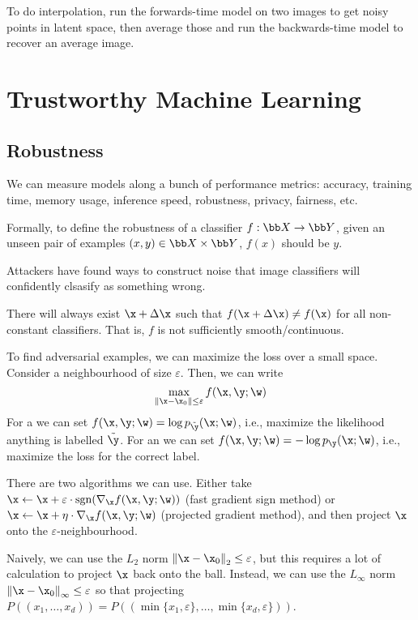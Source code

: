 \documentclass[class=cs480,notes,tikz]{agony}
\begin{document}
To do interpolation, run the forwards-time model on two images to get
noisy points in latent space, then average those and run the backwards-time model
to recover an average image.

\chapter{Trustworthy Machine Learning}
\section{Robustness}

We can measure models along a bunch of performance metrics:
accuracy, training time, memory usage, inference speed,
robustness, privacy, fairness, etc.

Formally, to define the robustness of a classifier $f : \bb X \to \bb Y$,
given an unseen pair of examples $(x,y) \in \bb X \times \bb Y$, $f(x)$ should be $y$.

Attackers have found ways to construct noise that image classifiers
will confidently clsasify as something wrong.

There will always exist  $\x + \Delta\x$
such that $f(\x + \Delta\x) \neq f(\x)$ for all non-constant classifiers.
That is, $f$ is not sufficiently smooth/continuous.

To find adversarial examples, we can maximize the loss over a small space.
Consider a neighbourhood of size $\varepsilon$. Then, we can write
\[ \max_{\norm{\x-\x_0} \leq \varepsilon} f(\x,\y;\w) \]
For a  we can set $f(\x,\y;\w) = \log p_{\tilde{\y}}(\x;\w)$,
i.e., maximize the likelihood anything is labelled $\tilde{\y}$.
For an  we can set $f(\x,\y;\w) = -\log p_{\y}(\x;\w)$,
i.e., maximize the loss for the correct label.

There are two algorithms we can use.
Either take $\x \gets \x + \varepsilon\cdot\sgn(\nabla_{\x}f(\x,\y;\w))$
(fast gradient sign method)
or $\x \gets \x + \eta\cdot\nabla_{\x}f(\x,\y;\w)$
(projected gradient method),
and then project $\x$ onto the $\varepsilon$-neighbourhood.

Naively, we can use the $L_2$ norm $\norm{\x-\x_0}_2 \leq \varepsilon$,
but this requires a lot of calculation to project $\x$ back onto the ball.
Instead, we can use the $L_{\infty}$ norm $\norm{\x-\x_0}_\infty \leq \varepsilon$
so that projecting $P((x_1,\dotsc,x_d)) = P((\min\{x_1,\varepsilon\},\dotsc,\min\{x_d,\varepsilon\}))$.
\end{document}
